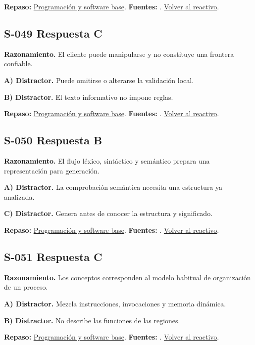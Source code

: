 \textbf{Repaso:} \hyperref[sec:s2]{Programación y software base}. \textbf{Fuentes:} \cite{ostep,cppreference,compiler}. \hyperref[q:S-048]{Volver al reactivo}.\par\medskip

\subsection*{S-049 \quad Respuesta C}\label{s:S-049}
\textbf{Razonamiento.} El cliente puede manipularse y no constituye una frontera confiable.

\textbf{A) Distractor. }Puede omitirse o alterarse la validación local.

\textbf{B) Distractor. }El texto informativo no impone reglas.

\textbf{Repaso:} \hyperref[sec:s2]{Programación y software base}. \textbf{Fuentes:} \cite{ostep,cppreference,compiler}. \hyperref[q:S-049]{Volver al reactivo}.\par\medskip

\subsection*{S-050 \quad Respuesta B}\label{s:S-050}
\textbf{Razonamiento.} El flujo léxico, sintáctico y semántico prepara una representación para generación.

\textbf{A) Distractor. }La comprobación semántica necesita una estructura ya analizada.

\textbf{C) Distractor. }Genera antes de conocer la estructura y significado.

\textbf{Repaso:} \hyperref[sec:s2]{Programación y software base}. \textbf{Fuentes:} \cite{ostep,cppreference,compiler}. \hyperref[q:S-050]{Volver al reactivo}.\par\medskip

\subsection*{S-051 \quad Respuesta C}\label{s:S-051}
\textbf{Razonamiento.} Los conceptos corresponden al modelo habitual de organización de un proceso.

\textbf{A) Distractor. }Mezcla instrucciones, invocaciones y memoria dinámica.

\textbf{B) Distractor. }No describe las funciones de las regiones.

\textbf{Repaso:} \hyperref[sec:s2]{Programación y software base}. \textbf{Fuentes:} \cite{ostep,cppreference,compiler}. \hyperref[q:S-051]{Volver al reactivo}.\par\medskip

